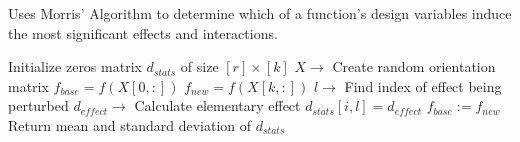 \begin{algorithm}
\caption{\label{code:morris_algorithm} 
Uses Morris' Algorithm to determine which of a function's design variables induce the most significant effects and interactions.} 
\begin{algorithmic}[1]
\State Initialize zeros matrix $d_{stats}$ of size $[r]\times[k]$
   \State $X\rightarrow$ Create random orientation matrix 
   \State $f_{base} = f(X[0,:])$
      \State $f_{new} = f(X[k,:])$
      \State $l\rightarrow$ Find index of effect being perturbed
      \State $d_{effect}\rightarrow$ Calculate elementary effect  
      \State $d_{stats}[i,l] = d_{effect}$
      \State $f_{base} := f_{new}$
   \EndFor
\EndFor
\State Return mean and standard deviation of $d_{stats}$ 
\end{algorithmic}
\end{algorithm}
